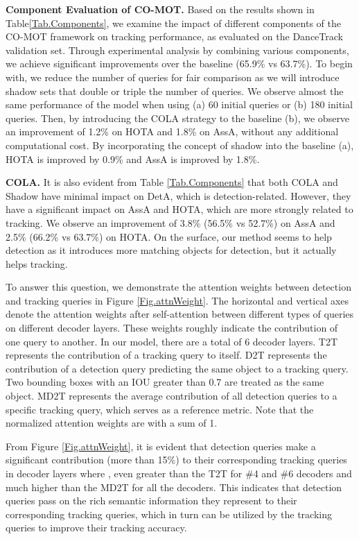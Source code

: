 \documentclass{article}
\begin{document}
\textbf{Component Evaluation of CO-MOT.} Based on the results shown in Table\ref{Tab.Components}, we examine the impact of different components of the CO-MOT framework on tracking performance, as evaluated on the DanceTrack validation set. Through experimental analysis by combining various components, we achieve significant improvements over the baseline (65.9\% vs 63.7\%). To begin with, we reduce the number of queries for fair comparison as we will introduce shadow sets that double or triple the number of queries. We observe almost the same performance of the model when using (a) 60 initial queries or (b) 180 initial queries. Then, by introducing the COLA strategy to the baseline (b), we observe an improvement of 1.2\% on HOTA and 1.8\% on AssA, without any additional computational cost. By incorporating the concept of shadow into the baseline (a), HOTA is improved by 0.9\% and AssA is improved by 1.8\%.



\textbf{COLA.} It is also evident from Table \ref{Tab.Components} that both COLA and Shadow have minimal impact on DetA, which is detection-related. However, they have a significant impact on AssA and HOTA, which are more strongly related to tracking. We observe an improvement of 3.8\% (56.5\% vs 52.7\%) on AssA and 2.5\% (66.2\% vs 63.7\%) on HOTA. On the surface, our method seems to help detection as it introduces more matching objects for detection, but it actually helps tracking. 

To answer this question, we demonstrate the attention weights between detection and tracking queries in Figure \ref{Fig.attnWeight}. The horizontal and vertical axes denote the attention weights after self-attention between different types of queries on different decoder layers. These weights roughly indicate the contribution of one query to another. In our model, there are a total of 6 decoder layers. T2T represents the contribution of a tracking query to itself. D2T represents the contribution of a detection query predicting the same object to a tracking query. Two bounding boxes with an IOU greater than 0.7 are treated as the same object. MD2T represents the average contribution of all detection queries to a specific tracking query, which serves as a reference metric. Note that the normalized attention weights are with a sum of 1.

From Figure \ref{Fig.attnWeight}, it is evident that detection queries make a significant contribution (more than 15\%) to their corresponding tracking queries in decoder layers where , even greater than the T2T for \#4 and \#6 decoders and much higher than the MD2T for all the decoders. This indicates that detection queries pass on the rich semantic information they represent to their corresponding tracking queries, which in turn can be utilized by the tracking queries to improve their tracking accuracy.
\end{document}

